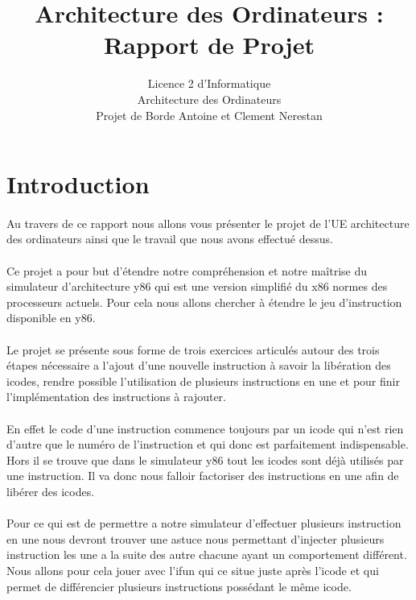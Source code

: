 \documentclass[12pt]{article}
\title{Architecture des Ordinateurs : Rapport de Projet}
\author{Licence 2 d'Informatique\\ 
  Architecture des Ordinateurs\\
  Projet de Borde Antoine et Clement Nerestan}
\begin{document}
\maketitle

\newpage

\tableofcontents

\newpage

\section{Introduction}

\paragraph{} Au travers de ce rapport nous allons vous présenter le projet
 de l'UE architecture des ordinateurs ainsi que le travail que nous avons 
 effectué dessus.

\paragraph{} Ce projet a pour but d'étendre notre compréhension et notre 
maîtrise du simulateur d'architecture y86 qui est une version simplifié
du x86 normes des processeurs actuels. Pour cela nous allons chercher à 
étendre le jeu d'instruction disponible en y86.

\paragraph{} Le projet se présente sous forme de trois exercices
articulés autour des trois étapes
nécessaire a l'ajout d'une nouvelle instruction à savoir la libération
des icodes, rendre possible l'utilisation de plusieurs instructions en
une et pour finir l’implémentation des instructions à rajouter.

\paragraph{} En effet le code d'une instruction commence toujours par un
 icode qui n'est rien d'autre que le numéro de l'instruction et qui
 donc est parfaitement indispensable. Hors il se trouve que dans le simulateur
 y86 tout les icodes sont déjà utilisés par une instruction. Il va donc nous
 falloir factoriser des instructions en une afin de libérer des icodes.

\paragraph{} Pour ce qui est de permettre a notre simulateur d’effectuer
plusieurs instruction en une nous devront trouver une astuce nous permettant
d'injecter plusieurs instruction les une a la suite des autre chacune ayant un
comportement différent. Nous allons pour cela jouer avec l'ifun qui ce situe
juste après l'icode et qui permet de différencier plusieurs instructions possédant le même icode.
\end{document}
